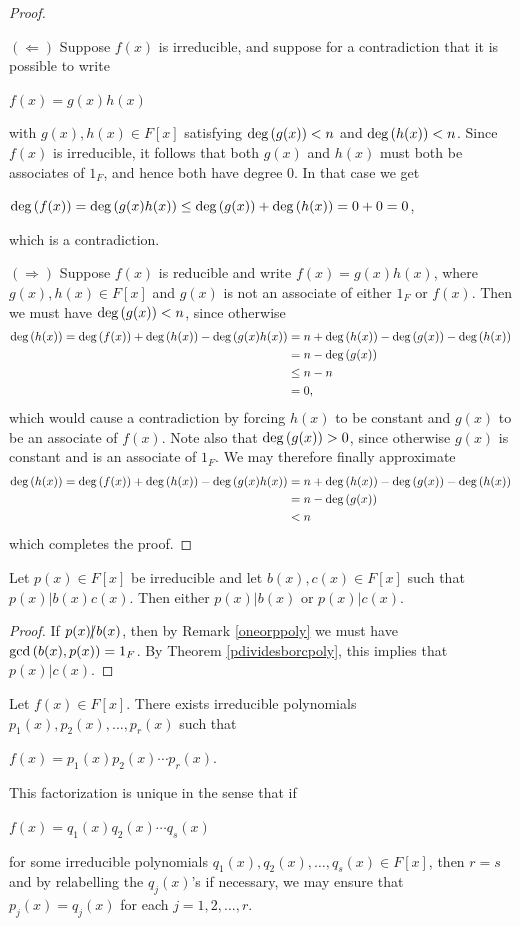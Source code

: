 \documentclass[11pt,fleqn,dvipsnames,usenames]{article}
\newcommand{\p}{\noindent}
\begin{document}
\begin{proof}~

\p $(\Leftarrow)$ Suppose $f(x)$ is irreducible, and suppose for a contradiction that it is possible to write
\begin{center}
$f(x) = g(x)h(x)$
\end{center}
with $g(x),h(x)\in F[x]$ satisfying $\text{deg}\left(g(x)\right) < n$ and $\text{deg}\left(h(x)\right) < n$.  Since $f(x)$ is irreducible, it follows that both $g(x)$ and $h(x)$ must both be associates of $1_{F}$, and hence both have degree $0$.  In that case we get
\begin{center}
$\text{deg}\left(f(x)\right) = \text{deg}\left(g(x)h(x)\right)\leq \text{deg}\left(g(x)\right) + \text{deg}\left(h(x)\right) = 0 + 0 = 0$,
\end{center}
which is a contradiction.
\vsp

\p $(\Rightarrow)$ Suppose $f(x)$ is reducible and write $f(x) = g(x)h(x)$, where $g(x),h(x)\in F[x]$ and $g(x)$ is not an associate of either $1_{F}$ or $f(x)$.  Then we must have $\text{deg}\left(g(x)\right) < n$, since otherwise
\begin{align*}
\text{deg}\left(h(x)\right) = \text{deg}\left(f(x)\right) + \text{deg}\left(h(x)\right) - \text{deg}\left(g(x)h(x)\right) &= n + \text{deg}\left(h(x)\right) - \text{deg}\left(g(x)\right) - \text{deg}\left(h(x)\right)\\
&= n - \text{deg}\left(g(x)\right)\\
&\leq n - n\\
&= 0,
\end{align*}
which would cause a contradiction by forcing $h(x)$ to be constant and $g(x)$ to be an associate of $f(x)$.  Note also that $\text{deg}\left(g(x)\right) > 0$, since otherwise $g(x)$ is constant and is an associate of $1_{F}$.  We may therefore finally approximate
\begin{align*}
\text{deg}\left(h(x)\right) = \text{deg}\left(f(x)\right) + \text{deg}\left(h(x)\right) - \text{deg}\left(g(x)h(x)\right) &= n + \text{deg}\left(h(x)\right) - \text{deg}\left(g(x)\right) - \text{deg}\left(h(x)\right)\\
&= n - \text{deg}\left(g(x)\right)\\
&< n
\end{align*}
which completes the proof.
\end{proof}
%
\begin{theorem}
Let $p(x)\in F[x]$ be irreducible and let $b(x),c(x)\in F[x]$ such that $p(x)|b(x)c(x)$.  Then either $p(x)|b(x)$ or $p(x)|c(x)$.
\end{theorem}
%
\begin{proof}
If $p(x)|\kern-0.9ex{/} b(x)$, then by Remark \ref{oneorppoly} we must have $\text{gcd}\left(b(x),p(x)\right) = 1_{F}$.  By Theorem \ref{pdividesborcpoly}, this implies that $p(x)|c(x)$.
\end{proof}
%
\begin{theorem}
Let $f(x)\in F[x]$.  There exists irreducible polynomials $p_{1}(x),p_{2}(x),\ldots,p_{r}(x)$ such that
\begin{center}
$f(x) = p_{1}(x)p_{2}(x)\cdots p_{r}(x)$.
\end{center}
\p This factorization is unique in the sense that if
\begin{center}
$f(x) = q_{1}(x)q_{2}(x)\cdots q_{s}(x)$
\end{center}
for some irreducible polynomials $q_{1}(x),q_{2}(x),\ldots, q_{s}(x)\in F[x]$, then $r = s$ and by relabelling the $q_{j}(x)$'s if necessary, we may ensure that $p_{j}(x) = q_{j}(x)$ for each $j = 1,2,\ldots, r$.
\end{theorem}
\end{document}
